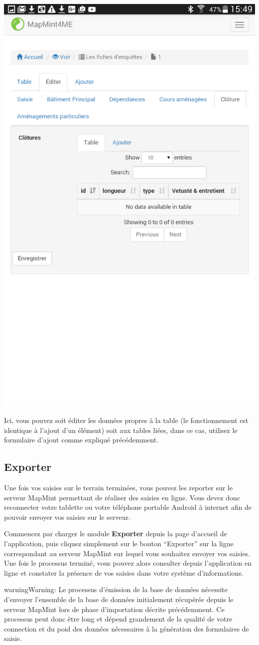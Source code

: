 \documentclass[letterpaper,10pt,english]{sphinxmanual}
\begin{document}
{\hfill\includegraphics[width=0.450\linewidth]{mm4me-view-edit.png}\hfill}

Ici, vous pouvez soit éditer les données propres à la table (le fonctionnement est identique à l'ajout d'un élément) soit aux tables liées, dans ce cas, utilisez le formulaire d'ajout comme expliqué précédemment.


\subsection{Exporter}
\label{tables/mapmint4me:exporter}
Une fois vos saisies sur le terrain terminées, vous pouvez les reporter sur le serveur MapMint permettant de réaliser des saisies en ligne. Vous devez donc reconnecter votre tablette ou votre téléphone portable Android à internet afin de pouvoir envoyer vos saisies sur le serveur.

Commencez par charger le module \textbf{Exporter} depuis la page d'accueil de l'application, puis cliquez simplement sur le bouton ``Exporter'' sur la ligne correspondant au serveur MapMint sur lequel vous souhaitez envoyer vos saisies. Une fois le processus terminé, vous pouvez alors consulter depuis l'application en ligne et constater la présence de vos saisies dans votre système d'informations.

\begin{notice}{warning}{Warning:}
Le processus d'émission de la base de données nécessite d'envoyer l'ensemble de la base de données initialement récupérée depuis le serveur MapMint lors de phase d'importation décrite précédemment. Ce processus peut donc être long et dépend grandement de la qualité de votre connection et du poid des données nécessaires à la génération des formulaires de saisie.
\end{notice}
\end{document}
